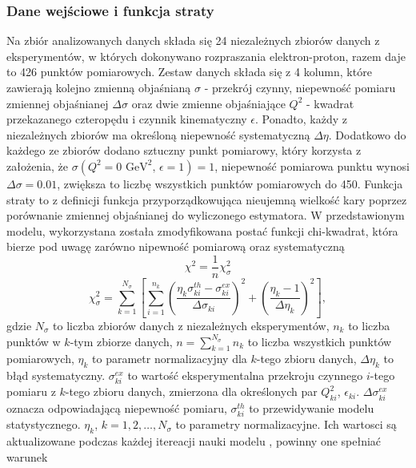 \documentclass[11pt]{book}
\theoremstyle{definition}
\begin{document}
%
\subsubsection{Dane wejściowe i funkcja straty}
%
%
Na zbiór analizowanych danych składa się 24 niezależnych zbiorów danych z eksperymentów, w których dokonywano rozpraszania elektron-proton, razem daje to 426 punktów pomiarowych. Zestaw danych składa się z 4 kolumn, które zawierają kolejno zmienną objaśnianą $\sigma$ - przekrój czynny, niepewność pomiaru zmiennej objaśnianej $\Delta \sigma$ oraz dwie zmienne objaśniające $Q^2$ - kwadrat przekazanego czteropędu i czynnik kinematyczny $\epsilon$. Ponadto, każdy z niezależnych zbiorów ma określoną niepewność systematyczną $\Delta \eta$.  Dodatkowo do każdego ze zbiorów dodano sztuczny punkt pomiarowy, który korzysta z założenia, że $\sigma \left(Q^2 = 0 \text{ GeV}^2, \, \epsilon = 1 \right) = 1$, niepewność pomiarowa punktu wynosi $\Delta \sigma = 0.01$, zwiększa to liczbę wszystkich punktów pomiarowych do 450.
%
%
%
Funkcja straty to z definicji funkcja przyporządkowująca nieujemną wielkość kary poprzez porównanie zmiennej objaśnianej do wyliczonego estymatora. W przedstawionym modelu, wykorzystana została zmodyfikowana postać funkcji chi-kwadrat, która bierze pod uwagę zarówno nipewność pomiarową oraz systematyczną
%
\begin{equation}
\chi^2 = \frac{1}{n} \chi_{\sigma}^2
\end{equation}
%
\begin{equation}
\chi_{\sigma}^2 = \sum_{k=1}^{N_{\sigma}} \left[ \sum_{i=1}^{n_k} \left( \frac{\eta_k \sigma^{th}_{ki} - \sigma^{ex}_{ki}}{\Delta \sigma_{ki}} \right)^2 + \left(\frac{\eta_k - 1}{\Delta \eta_k}\right)^2 \right],
\end{equation}
%
gdzie $N_{\sigma}$ to liczba zbiorów danych z niezależnych eksperymentów, $n_k$ to liczba punktów w $k$-tym zbiorze danych, $n = \sum_{k=1}^{N_{\sigma}}n_k$ to liczba wszystkich punktów pomiarowych, $\eta_k$ to parametr normalizacyjny dla $k$-tego zbioru danych, $\Delta \eta_k$ to błąd systematyczny. $\sigma^{ex}_{ki}$ to wartość eksperymentalna przekroju czynnego $i$-tego pomiaru z $k$-tego zbioru danych, zmierzona dla określonych par $Q^2_{ki}$, $\epsilon_{ki}$. $\Delta \sigma_{ki}^{ex}$ oznacza odpowiadającą niepewność pomiaru, $\sigma_{ki}^{th}$ to przewidywanie modelu statystycznego. $\eta_k$, $k =1,2,\dots, N_{\sigma}$ to parametry normalizacyjne. Ich wartosci są aktualizowane podczas każdej itereacji nauki modelu \cite{PhysRevC.84.034314}, powinny one spełniać warunek
\end{document}

